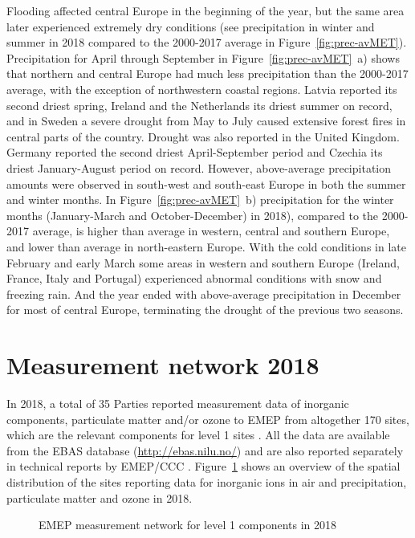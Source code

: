Flooding affected central Europe in the beginning of the year, but the same area later experienced extremely dry conditions (see precipitation in winter and summer in 2018 compared to the 2000-2017 average in Figure~\ref{fig:prec-avMET}). Precipitation for April through September in Figure~\ref{fig:prec-avMET}~a) shows that northern and central Europe had much less precipitation than the 2000-2017 average, with the exception of northwestern coastal regions. Latvia reported its second driest spring, Ireland and the Netherlands its driest summer on record, and in Sweden a severe drought from May to July caused extensive forest fires in central parts of the country. Drought was also reported in the United Kingdom. Germany reported the second driest April-September period and Czechia its driest January-August period on record.
However, above-average precipitation amounts were observed in south-west and south-east Europe in both the summer and winter months. In Figure~\ref{fig:prec-avMET}~b) precipitation for the winter months (January-March and October-December) in 2018), compared to the 2000-2017 average, is higher than average in western, central and southern Europe, and lower than average in north-eastern Europe. With the cold conditions in late February and early March some areas in western and southern Europe (Ireland, France, Italy and Portugal) experienced abnormal conditions with snow and freezing rain. And the year ended with above-average precipitation in December for most of central Europe, terminating the drought of the previous two seasons.


\section{Measurement network 2018} 
\label{Obs_2018}

In 2018, a total of 35 Parties reported measurement data of inorganic components, particulate matter and/or ozone to EMEP from altogether 170 sites, which are the relevant components for level 1 sites \citep{MonStrat2019}. 
All the data are available from the EBAS database (\url{http://ebas.nilu.no/}) and are also reported separately in technical reports by EMEP/CCC \citep{Hjellbrekke2020a,Hjellbrekke2020b}. Figure~\ref{fig:EMEP-measurement-network} shows an overview of the spatial distribution of the sites reporting data for inorganic ions in air and precipitation, particulate matter and ozone in 2018.

\begin{figure}[h!]
 \centering
\caption{\label{fig:EMEP-measurement-network}EMEP measurement network for level 1 components in 2018}
\end{figure}


